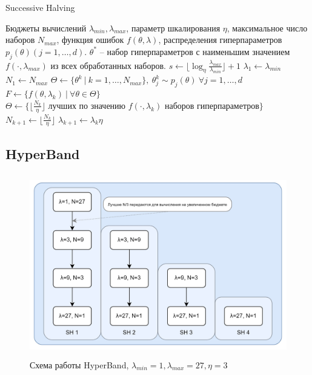 \documentclass[a4paper,12pt]{article}
\begin{document}
\begin{algorithm}[H]
    \caption{Successive Halving}\label{alg:sh}
  \begin{algorithmic}[1]
    \INPUT Бюджеты вычислений $\lambda_{min}, \lambda_{max}$, параметр шкалирования $\eta$, максимальное число наборов $N_{max}$, функция ошибок $f(\theta, \lambda)$, распределения гиперпараметров $p_{j}(\theta) (j = 1,\dots,d)$.
    \OUTPUT $\theta^*$ -- набор гиперпараметров с наименьшим значением $f(\cdot, \lambda_{max})$ из всех обработанных наборов.
    \STATE $s \gets \lfloor \log_{\eta} \frac{\lambda_{max}}{\lambda_{min}} \rfloor + 1$
    \STATE $\lambda_{1} \gets \lambda_{min}$
    \STATE $N_{1} \gets N_{max}$
    \STATE $\Theta \gets \{\theta^k\ |\ k = 1,\dots,N_{max}\},\ \theta^k_j \sim p_j(\theta)\ \forall j = 1,\dots,d$
        \STATE $F \gets \{f(\theta, \lambda_k)\ |\ \forall \theta \in \Theta\}$
        \STATE $\Theta \gets \{\lfloor \frac{N_k}{\eta} \rfloor \text{ лучших по значению } f(\cdot, \lambda_k) \text{ наборов гиперпараметров}\}$
        \STATE $N_{k+1} \gets \lfloor \frac{N_k}{\eta} \rfloor$
        \STATE $\lambda_{k+1} \gets \lambda_k\eta$
    \ENDFOR
  \end{algorithmic}

\end{algorithm}

\subsection{HyperBand}

\begin{figure}[h]
    \centering
    \includegraphics[height=8cm]{HB.jpg}
    \caption{Схема работы HyperBand, $\lambda_{min}=1,\lambda_{max}=27, \eta=3$}
    \label{fig:hb}
\end{figure}
\end{document}
